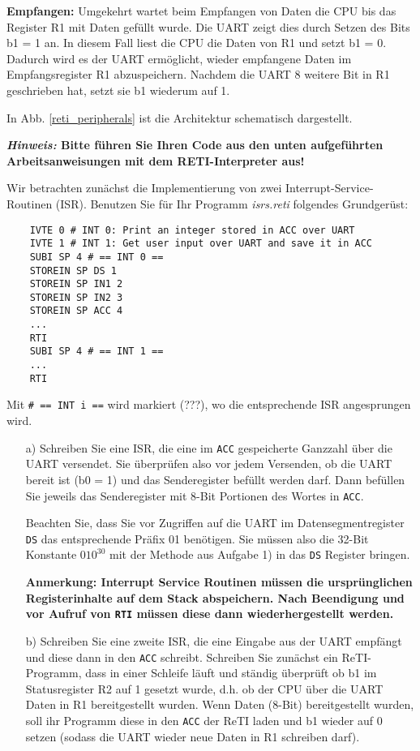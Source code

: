 \begin{exercise}
\textbf{Empfangen:} Umgekehrt wartet beim Empfangen von Daten die CPU bis das Register R1 mit Daten gefüllt wurde.
Die UART zeigt dies durch Setzen des Bits b1 = 1 an. In diesem Fall liest die CPU die Daten von
R1 und setzt b1 = 0. Dadurch wird es der UART ermöglicht, wieder empfangene
Daten im Empfangsregister R1 abzuspeichern. Nachdem die UART
8 weitere Bit in R1 geschrieben hat, setzt sie b1 wiederum auf 1.

In Abb. \ref{reti_peripherals} ist die Architektur schematisch dargestellt.


\textbf{\textit{Hinweis:} Bitte führen Sie Ihren Code aus den unten aufgeführten Arbeitsanweisungen mit dem RETI-Interpreter aus!}

Wir betrachten zunächst die Implementierung von zwei Interrupt-Service-Routinen (ISR).
Benutzen Sie für Ihr Programm \textit{isrs.reti} folgendes Grundgerüst:
\begin{verbatim}
	IVTE 0 # INT 0: Print an integer stored in ACC over UART
	IVTE 1 # INT 1: Get user input over UART and save it in ACC
	SUBI SP 4 # == INT 0 ==
	STOREIN SP DS 1 
	STOREIN SP IN1 2 
	STOREIN SP IN2 3 
	STOREIN SP ACC 4 
	...
	RTI
	SUBI SP 4 # == INT 1 ==
	...
	RTI
\end{verbatim}
Mit \verb_# == INT i ==_ wird markiert {\color{blue}(???)}, wo die entsprechende ISR angesprungen wird.
\begin{itemize}
\item[a)]
Schreiben Sie eine ISR, die eine im \texttt{ACC} gespeicherte
Ganzzahl über die UART versendet.
Sie überprüfen also vor jedem Versenden, ob die UART bereit ist (b0 = 1) und das Senderegister befüllt werden darf.
Dann befüllen Sie jeweils das Senderegister mit 8-Bit Portionen des Wortes in \texttt{ACC}.

Beachten Sie, dass Sie vor Zugriffen auf die UART im Datensegmentregister
\texttt{DS} das entsprechende Präfix 01 benötigen. Sie müssen also die 32-Bit Konstante 
$010^{30}$ mit der Methode aus Aufgabe 1) in das \texttt{DS} Register bringen.

\textbf{Anmerkung: Interrupt Service Routinen müssen die ursprünglichen Registerinhalte
		auf dem Stack abspeichern. Nach Beendigung und vor Aufruf von \texttt{RTI} müssen
		diese dann wiederhergestellt werden.} 

\item[b)]
Schreiben Sie eine zweite ISR, die eine Eingabe aus der UART empfängt
und diese dann in den \texttt{ACC} schreibt.
Schreiben Sie zunächst ein ReTI-Programm, dass in einer Schleife läuft und ständig überprüft ob b1
im Statusregister R2 auf 1 gesetzt wurde, d.h. ob der CPU über die UART Daten in R1 bereitgestellt wurden.
Wenn Daten (8-Bit) bereitgestellt wurden, soll ihr Programm diese in den \texttt{ACC} der ReTI laden
und b1 wieder auf 0 setzen (sodass die UART wieder neue Daten in R1 schreiben darf).



\end{itemize}
\end{exercise}
